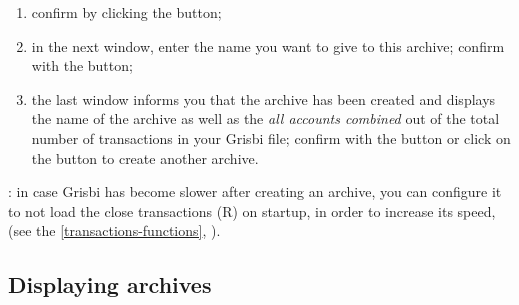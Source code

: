 \begin{enumerate}
\begin{itemize}
		\Note{}: the last line of the window indicates either an error in entering these parameters (in red) or the number of transactions that will be archived (all accounts combined) out of the total number of transactions in your Grisbi file.
	\end{itemize}
	\item confirm by clicking the  button;
	\item in the next window, enter the name you want to give to this archive; confirm with the  button;
	\item the last window informs you that the archive has been created and displays the name of the archive as well as the  \emph{all accounts combined} out of the total number of transactions in your Grisbi file; confirm with the  button or click on the  button to create another archive.
\end{enumerate}

\Note{}: in case Grisbi has become slower after creating an archive, you can configure it to not load the close transactions (R) on startup, in order to increase its speed, (see the \ref{transactions-functions}, ).

\subsection{Displaying archives\label{datamanagement-archive-display}}%

